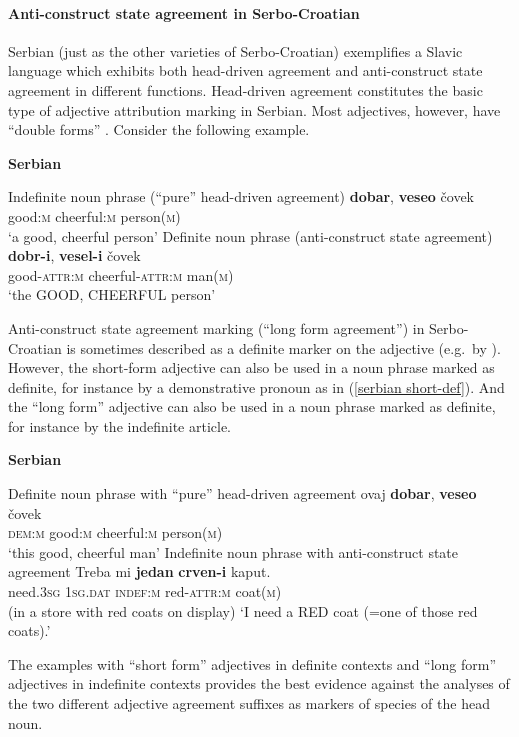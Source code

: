 \paragraph{Anti-construct state agreement in Serbo-Croatian} \label{serbian synchr}
Serbian (just as the other varieties of Serbo-Croatian) exemplifies a Slavic language which exhibits both head-driven agreement and anti-construct state agreement in different functions. Head-driven agreement constitutes the basic type of adjective attribution marking in Serbian. Most adjectives, however, have “double forms” \cite[179–180]{kramsky1972}. Consider the following example.
\begin{exe}
\ex \textbf{Serbian} \citep[59]{zlatic1997}
\begin{xlist}
\ex 	Indefinite noun phrase (“pure” head-driven agreement)
\gll	\textbf{dobar}, \textbf{veseo} čovek\\
	good:\textsc{m} cheerful:\textsc{m} person(\textsc{m})\\
\glt	‘a good, cheerful person’
\ex	Definite noun phrase (anti-construct state agreement)
\gll	\textbf{dobr-i}, \textbf{vesel-i} čovek\\
	good-\textsc{attr:m} cheerful-\textsc{attr:m} man(\textsc{m})\\
\glt	‘the GOOD, CHEERFUL person’
\end{xlist}
\end{exe}
Anti-construct state agreement marking (“long form agreement”) in Serbo-Croatian is sometimes described as a definite marker on the adjective (e.g.~by \citealt[18–19]{kordic1997}). However, the short-form adjective can also be used in a noun phrase marked as definite, for instance by a demonstrative pronoun as in (\ref{serbian short-def}). And the “long form” adjective can also be used in a noun phrase marked as definite, for instance by the indefinite article. 
\begin{exe}
\ex \textbf{Serbian} \citep{marusic-etal2007}
\begin{xlist}
\ex	Definite noun phrase with “pure” head-driven agreement \label{serbian short-def} 
\gll	ovaj \textbf{dobar}, \textbf{veseo} \v{c}ovek\\
	\textsc{dem:m} good:\textsc{m} cheerful:\textsc{m} person(\textsc{m})\\
\glt	‘this good, cheerful man’
\ex 	Indefinite noun phrase with anti-construct state agreement \label{serb indef}
\gll	Treba mi \textbf{jedan} \textbf{crven-i} kaput.\\
	need.\textsc{3sg} \textsc{1sg.dat} \textsc{indef:m} red-\textsc{attr:m} coat(\textsc{m})\\
\glt (in a store with red coats on display) ‘I need a RED coat (=one of those red coats).’
\end{xlist}
\end{exe}
The examples with “short form” adjectives in definite contexts and “long form” adjectives in indefinite contexts provides the best evidence against the analyses of the two different adjective agreement suffixes as markers of species of the head noun. 

